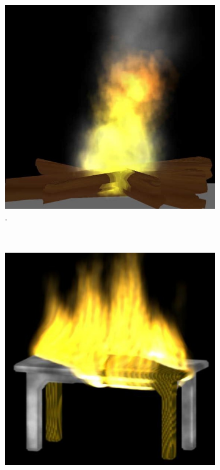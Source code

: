\begin{figure}[htpb!]
        \centering
       \begin{subfigure}[t]{0.3\textwidth}
                \includegraphics[width=\textwidth]{img/wei_2002}
                \caption{\cite{Wei:2002}.}
        \end{subfigure}%
        ~        
        \begin{subfigure}[t]{0.285\textwidth}
                \includegraphics[width=\textwidth]{img/zhao_2003}

\end{subfigure}
\end{figure}
